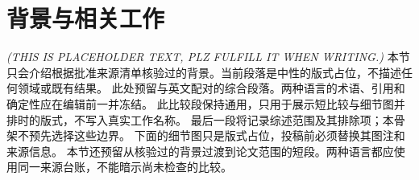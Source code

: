 \section{背景与相关工作}\label{sec:background-related-work}
\textit{(THIS IS PLACEHOLDER TEXT, PLZ FULFILL IT WHEN WRITING.)}
本节只会介绍根据批准来源清单核验过的背景。当前段落是中性的版式占位，不描述任何领域或既有结果。
此处预留与英文配对的综合段落。两种语言的术语、引用和确定性应在编辑前一并冻结。
此比较段保持通用，只用于展示短比较与细节图并排时的版式，不写入真实工作名称。
最后一段将记录综述范围及其排除项；本骨架不预先选择这些边界。
下面的细节图只是版式占位，投稿前必须替换其图注和来源信息。
本节还预留从核验过的背景过渡到论文范围的短段。两种语言都应使用同一来源台账，不能暗示尚未检查的比较。

